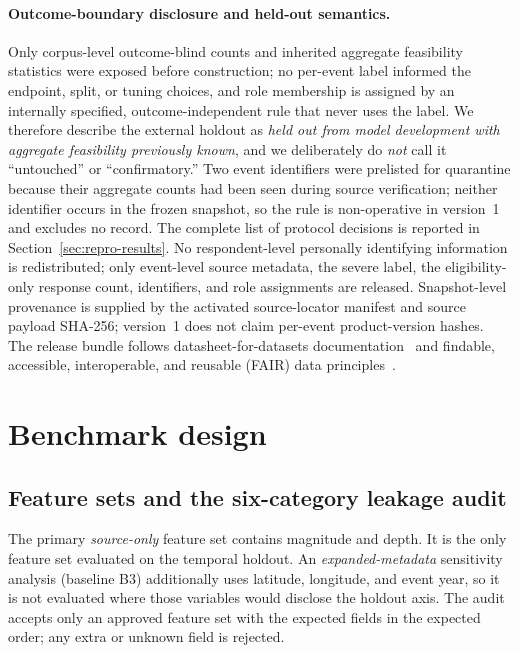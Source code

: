 \documentclass[pdflatex,sn-basic,iicol]{sn-jnl}
\begin{document}
\paragraph{Outcome-boundary disclosure and held-out semantics.} Only corpus-level
outcome-blind counts and inherited aggregate feasibility statistics were exposed
before construction; no per-event label informed the endpoint, split, or
tuning choices, and role membership is assigned by an internally specified,
outcome-independent rule that never uses the label. We therefore describe the
external holdout as \emph{held out from model development with aggregate
feasibility previously known}, and we deliberately do \emph{not} call it
``untouched'' or ``confirmatory.'' Two event identifiers were prelisted for
quarantine because their aggregate counts had been seen during source
verification; neither identifier occurs in the frozen snapshot, so the rule is
non-operative in version~1 and excludes no record. The complete list of protocol decisions is reported in
Section~\ref{sec:repro-results}. No
respondent-level personally identifying information is redistributed; only
event-level source metadata, the severe label, the eligibility-only response
count, identifiers, and role assignments are released. Snapshot-level
provenance is supplied by the activated source-locator manifest and source
payload SHA-256; version~1 does not claim per-event product-version hashes. The
release bundle follows datasheet-for-datasets
documentation~\citep{gebru2021datasheets} and findable, accessible,
interoperable, and reusable (FAIR) data
principles~\citep{wilkinson2016fair}.

\section{Benchmark design}\label{sec:design}

\subsection{Feature sets and the six-category leakage audit}\label{sec:leakage}

The primary \emph{source-only} feature set contains magnitude and depth. It is
the only feature set evaluated on the temporal holdout. An
\emph{expanded-metadata} sensitivity analysis (baseline B3) additionally uses
latitude, longitude, and event year, so it is not evaluated where those
variables would disclose the holdout axis. The audit accepts only an approved
feature set with the expected fields in the expected order; any extra or unknown
field is rejected.
\end{document}
